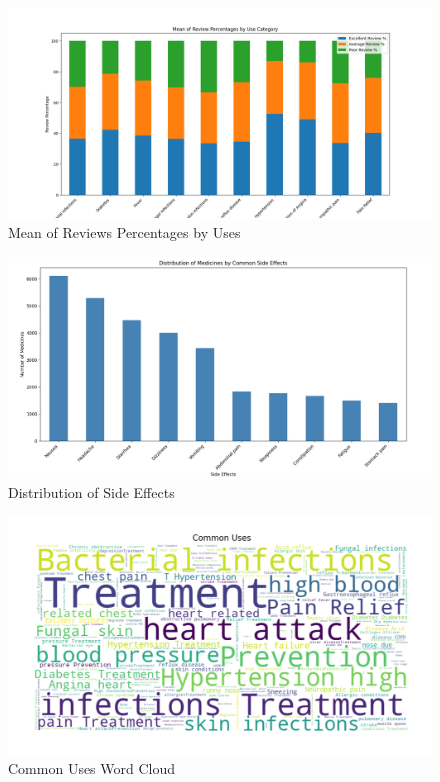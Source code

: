 \documentclass[sigconf]{acmart}
\begin{document}
\begin{figure}[H]
	\centering
	\includegraphics[width=\linewidth]{graphic3.png}
	\caption{Mean of Reviews Percentages by Uses}
	\label{fig:reviewPercMean}
  \end{figure}

\begin{figure}[H]
	\centering
	\includegraphics[width=\linewidth]{graphic4.png}
	\caption{Distribution of Side Effects}
	\label{fig:sideEffectsDistribution}
  \end{figure}

\begin{figure}[H]
	\centering
	\includegraphics[width=\linewidth]{graphic5.png}
	\caption{Common Uses Word Cloud}
	\label{fig:commonUses}
  \end{figure}
\end{document}
